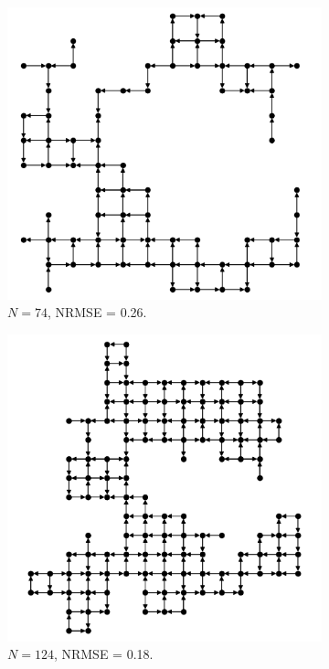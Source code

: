 \begin{figure}[t] \centering
  \begin{subfigure}{1.0\textwidth} \centering
\includegraphics[width=0.5\linewidth]{figures/sq-grid-grow-74.png}
    \caption{$N = 74$, NRMSE = 0.26.}
    \label{fig:sq-grid-grow-74}
  \end{subfigure}
  \begin{subfigure}{.49\textwidth} \centering
\includegraphics[width=1.0\linewidth]{figures/sq-grid-grow-124.png}
    \caption{$N = 124$, NRMSE = 0.18.}
    \label{fig:sq-grid-grow-124}
  \end{subfigure}
  \begin{subfigure}{.49\textwidth} \centering

\end{subfigure}
\end{figure}
